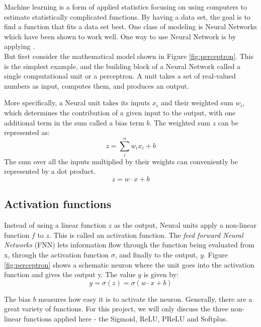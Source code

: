 Machine learning is a form of applied statistics focusing on using computers to estimate statistically complicated functions. By having a data set, the goal is to find a function that fits a data set best. One class of modeling is Neural Networks which have been shown to work well. One way to use Neural Network is by applying .\\
But first consider the mathematical model shown in Figure \ref{fig:perceptron}. This is the simplest example, and the building block of a Neural Network called a single computational unit or a perceptron. A unit takes
a set of real-valued numbers as input, computes them, and produces an output.

More specifically, a Neural unit takes its inputs $x_i$ and their weighted sum $w_i$, which determines the contribution of a given input to the output, with one additional term in the sum called a bias term $b$.
The weighted sum $z$ can be represented as:
\begin{equation}
  \label{eq:ffn_eq}
  z = \sum_i^n w_i x_i + b
\end{equation}
The sum over all the inputs multiplied by their weights can conveniently be represented by a dot product. 
\begin{equation}
  \label{eq:ffn_eq}
  z = w \cdot x + b
\end{equation}

\subsection{Activation functions}
Instead of using a linear function $z$ as the output, Neural units apply a non-linear function $f$ to $z$. This is called an activation function. 
The \emph{feed forward Neural Networks} (FNN) lets information ﬂow through the function being evaluated from x, through the activation function $\sigma$, and ﬁnally to the output, $y$. Figure \ref{fig:perceptron} shows a schematic neuron where the unit goes into the activation function and gives the output y.
The value $y$ is given by:
\begin{equation}
  \label{eq:activationfunc}
  y = \sigma(z) = \sigma(w\cdot  x + b)
\end{equation}

The bias $b$ measures how easy it is to activate the neuron. Generally, there are a great variety of functions. For this project, we will only discuss the three non-linear functions applied here - the Sigmoid, \acrshort{ReLU}, \acrshort{PReLU} and Softplus.\\


